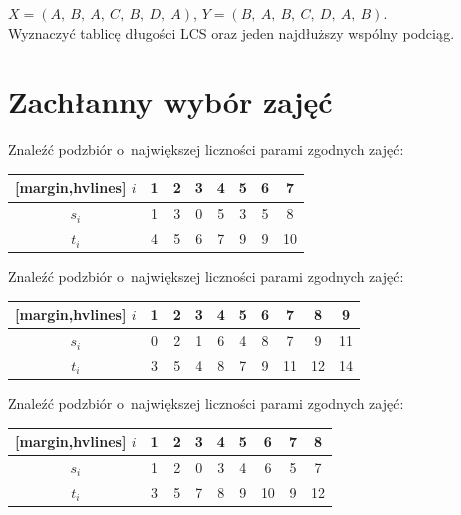 	\begin{example}
		$X = (A,\ B,\ A,\ C,\ B,\ D,\ A)$, \quad $Y = (B,\ A,\ B,\ C,\ D,\ A,\ B)$.\\
		Wyznaczyć tablicę długości LCS oraz jeden najdłuższy wspólny podciąg.
	\end{example}

\section{Zachłanny wybór zajęć}

\begin{example}
	Znaleźć podzbiór o~największej liczności parami zgodnych zajęć:
	\begin{aztable}
		\centering
		\renewcommand{\arraystretch}{1.2}
		\begin{NiceTabular}{c|ccccccc}[margin,hvlines]
			$i$   & 1 & 2 & 3 & 4 & 5 & 6 & 7  \\
			\hline
			$s_i$ & 1 & 3 & 0 & 5 & 3 & 5 & 8  \\
			$t_i$ & 4 & 5 & 6 & 7 & 9 & 9 & 10
		\end{NiceTabular}
	\end{aztable}
\end{example}

\begin{example}
	Znaleźć podzbiór o~największej liczności parami zgodnych zajęć:
	\begin{aztable}
		\centering
		\renewcommand{\arraystretch}{1.2}
		\begin{NiceTabular}{c|ccccccccc}[margin,hvlines]
			$i$   & 1 & 2 & 3 & 4 & 5 & 6 & 7 & 8  & 9  \\
			\hline
			$s_i$ & 0 & 2 & 1 & 6 & 4 & 8 & 7 & 9  & 11 \\
			$t_i$ & 3 & 5 & 4 & 8 & 7 & 9 & 11& 12 & 14
		\end{NiceTabular}
	\end{aztable}
\end{example}

	\begin{example}
		Znaleźć podzbiór o~największej liczności parami zgodnych zajęć:
		\begin{aztable}
			\centering
			\renewcommand{\arraystretch}{1.2}
			\begin{NiceTabular}{c|cccccccc}[margin,hvlines]
				$i$   & 1 & 2 & 3 & 4 & 5 & 6 & 7 & 8  \\
				\hline
				$s_i$ & 1 & 2 & 0 & 3 & 4 & 6 & 5 & 7  \\
				$t_i$ & 3 & 5 & 7 & 8 & 9 & 10& 9 & 12
			\end{NiceTabular}
		\end{aztable}
	\end{example}

